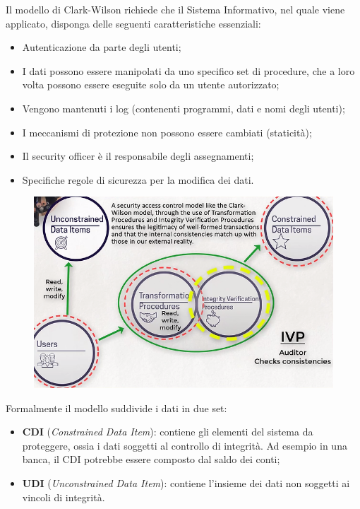 Il modello di Clark-Wilson richiede che il Sistema Informativo, nel quale viene
applicato, disponga
delle seguenti caratteristiche essenziali:

\begin{itemize}
      \item Autenticazione da parte degli utenti;
      \item I dati possono essere manipolati da uno specifico set di procedure,
            che a loro volta
            possono essere eseguite solo da un utente autorizzato;
      \item Vengono mantenuti i log (contenenti programmi, dati e nomi degli
            utenti);
      \item I meccanismi di protezione non possono essere cambiati (staticità);
      \item Il security officer è il responsabile degli assegnamenti;
      \item Specifiche regole di sicurezza per la modifica dei dati.
\end{itemize}

\begin{figure}[H]
      \centering
      \includegraphics[width=12cm, keepaspectratio]{capitoli/policy/imgs/clark_wilson3.png}
\end{figure}

Formalmente il modello suddivide i dati in due set:

\begin{itemize}
      \item \textbf{CDI} (\textit{Constrained Data Item}): contiene gli elementi
            del sistema da proteggere, ossia i dati
            soggetti al controllo di integrità. Ad esempio in una banca, il CDI
            potrebbe essere composto
            dal saldo dei conti;
      \item \textbf{UDI} (\textit{Unconstrained Data Item}): contiene l'insieme
            dei dati non soggetti ai vincoli di
            integrità.
\end{itemize}

